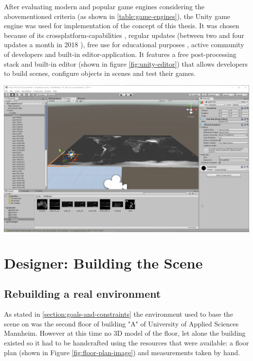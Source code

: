 After evaluating modern and popular game engines considering the abovementioned criteria (as shown in \ref{table:game-engines}), the Unity game engine was used for implementation of the concept of this thesis. It was chosen because of its crossplatform-capabilities \cite{UnityPlatformSupport}, regular updates (between two and four updates a month in 2018 \cite{UnityDownloadArchive}), free use for educational purposes \cite{UnityForEducation}, active community of developers \cite{UnityForum} and built-in editor-application. It features a free post-processing stack \cite{UnityPostProcessingStack} and built-in editor (shown in figure \ref{fig:unity-editor}) that allows developers to build scenes, configure objects in scenes and test their games.
\begin{center}
\noindent\includegraphics[width=14cm]{tex/img/ch05/UnityScreenshot.png}
\label{fig:unity-editor}
\end{center}

\section{Designer: Building the Scene}
\subsection{Rebuilding a real environment}
As stated in \ref{section:goals-and-constraints} the environment used to base the scene on was the second floor of building "A" of University of Applied Sciences Mannheim. However at this time no 3D model of the floor, let alone the building existed so it had to be handcrafted using the resources that were available: a floor plan (shown in Figure \ref{fig:floor-plan-image}) and measurements taken by hand.

